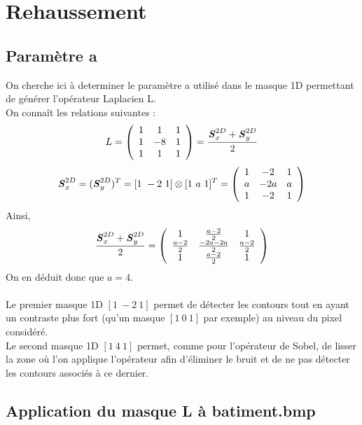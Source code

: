 \documentclass[11pt]{article}
\begin{document}
		\newpage

\section{Rehaussement}

	\subsection{Paramètre a}
	
		On cherche ici à determiner le paramètre a utilisé dans le masque 1D permettant de générer l'opérateur Laplacien L.\\
		On connaît les relations suivantes :\\
		\[ L = \left( \begin{array}{ccc}
1 & 1 & 1 \\
1 & -8 & 1 \\
1 & 1 & 1
\end{array} 
\right)
= \frac{\textbf{\textit{S}}_x^{2D} + \textbf{\textit{S}}_y^{2D}}{2}
\]
\[ \textbf{\textit{S}}_x^{2D} = (\textbf{\textit{S}}_y^{2D})^T = [1\ -2\ 1] \otimes [1\ a\ 1]^T
= \left( \begin{array}{ccc}
1 & -2 & 1 \\
a & -2a & a \\
1 & -2 & 1
\end{array} 
\right)
\] 
Ainsi,\\
\[ \frac{\textbf{\textit{S}}_x^{2D} + \textbf{\textit{S}}_y^{2D}}{2} = 
\left( \begin{array}{ccc}
1 & \frac{a-2}{2} & 1 \\
\frac{a-2}{2} & \frac{-2a-2a}{2} & \frac{a-2}{2} \\
1 & \frac{a-2}{2} & 1
\end{array} 
\right)
\] 
On en déduit donc que $a = 4$.\\
\\
Le premier masque 1D $[1\ -2\ 1]$ permet de détecter les contours tout en ayant un contraste plus fort (qu'un masque $[1\ 0\ 1]$ par exemple) au niveau du pixel considéré.\\
Le second masque 1D $[1\ 4\ 1]$ permet, comme pour l'opérateur de Sobel, de lisser la zone où l'on applique l'opérateur afin d'éliminer le bruit et de ne pas détecter les contours associés à ce dernier.\\

	\subsection{Application du masque L à batiment.bmp}
	
\end{document}
